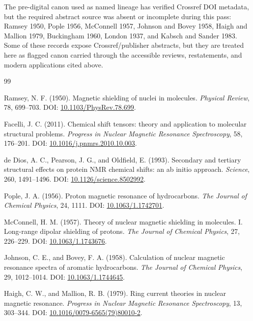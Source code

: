 \documentclass[11pt]{article}
\begin{document}
The pre-digital canon used as named lineage has verified Crossref DOI metadata,
but the required abstract source was absent or incomplete during this pass:
Ramsey 1950, Pople 1956, McConnell 1957, Johnson and Bovey 1958, Haigh and
Mallion 1979, Buckingham 1960, London 1937, and Kabsch and Sander 1983. Some of
these records expose Crossref/publisher abstracts, but they are treated here as
flagged canon carried through the accessible reviews, restatements, and modern
applications cited above.

\begin{thebibliography}{99}

Ramsey, N. F. (1950).
Magnetic shielding of nuclei in molecules.
\emph{Physical Review}, 78, 699--703.
DOI: \href{https://doi.org/10.1103/PhysRev.78.699}{10.1103/PhysRev.78.699}.

Facelli, J. C. (2011).
Chemical shift tensors: theory and application to molecular structural problems.
\emph{Progress in Nuclear Magnetic Resonance Spectroscopy}, 58, 176--201.
DOI: \href{https://doi.org/10.1016/j.pnmrs.2010.10.003}{10.1016/j.pnmrs.2010.10.003}.

de Dios, A. C., Pearson, J. G., and Oldfield, E. (1993).
Secondary and tertiary structural effects on protein NMR chemical shifts:
an ab initio approach.
\emph{Science}, 260, 1491--1496.
DOI: \href{https://doi.org/10.1126/science.8502992}{10.1126/science.8502992}.

Pople, J. A. (1956).
Proton magnetic resonance of hydrocarbons.
\emph{The Journal of Chemical Physics}, 24, 1111.
DOI: \href{https://doi.org/10.1063/1.1742701}{10.1063/1.1742701}.

McConnell, H. M. (1957).
Theory of nuclear magnetic shielding in molecules. I. Long-range dipolar
shielding of protons.
\emph{The Journal of Chemical Physics}, 27, 226--229.
DOI: \href{https://doi.org/10.1063/1.1743676}{10.1063/1.1743676}.

Johnson, C. E., and Bovey, F. A. (1958).
Calculation of nuclear magnetic resonance spectra of aromatic hydrocarbons.
\emph{The Journal of Chemical Physics}, 29, 1012--1014.
DOI: \href{https://doi.org/10.1063/1.1744645}{10.1063/1.1744645}.

Haigh, C. W., and Mallion, R. B. (1979).
Ring current theories in nuclear magnetic resonance.
\emph{Progress in Nuclear Magnetic Resonance Spectroscopy}, 13, 303--344.
DOI: \href{https://doi.org/10.1016/0079-6565(79)80010-2}{10.1016/0079-6565(79)80010-2}.


\end{thebibliography}
\end{document}
